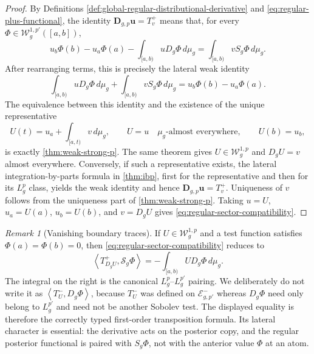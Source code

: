 \documentclass[preprint,12pt]{elsarticle}
\theoremstyle{definition}
\theoremstyle{remark}
\newtheorem{remark}[theorem]{Remark}
\newcommand{\ip}[2]{\left\langle#1,#2\right\rangle}
\begin{document}
\begin{proof}
By Definitions \ref{def:global-regular-distributional-derivative} and \eqref{eq:regular-plus-functional}, the identity $\mathbf D_{g,p}\mathbf u=T_v^+$ means that, for every $\Phi\in\mathcal W_g^{1,p'}([a,b])$,
\[
 u_b\Phi(b)-u_a\Phi(a)
 -\int_{[a,b)}uD_g\Phi\,d\mu_g
 =\int_{[a,b)}vS_g\Phi\,d\mu_g.
\]
After rearranging terms, this is precisely the lateral weak identity
\[
 \int_{[a,b)}uD_g\Phi\,d\mu_g
 +\int_{[a,b)}vS_g\Phi\,d\mu_g
 =u_b\Phi(b)-u_a\Phi(a).
\]
The equivalence between this identity and the existence of the unique representative
\[
 U(t)=u_a+\int_{[a,t)}v\,d\mu_g,
 \qquad U=u\quad\mu_g\text{-almost everywhere},
 \qquad U(b)=u_b,
\]
is exactly \cref{thm:weak-strong-p}. The same theorem gives $U\in\mathcal W_g^{1,p}$ and $D_gU=v$ almost everywhere. Conversely, if such a representative exists, the lateral integration-by-parts formula in \cref{thm:ibp}, first for the representative and then for its $L_g^p$ class, yields the weak identity and hence $\mathbf D_{g,p}\mathbf u=T_v^+$. Uniqueness of $v$ follows from the uniqueness part of \cref{thm:weak-strong-p}. Taking $u=U$, $u_a=U(a)$, $u_b=U(b)$, and $v=D_gU$ gives \eqref{eq:regular-sector-compatibility}.
\end{proof}

\begin{remark}[Vanishing boundary traces]\label{rem:zero-boundary-transposition}
If $U\in\mathcal W_g^{1,p}$ and a test function satisfies $\Phi(a)=\Phi(b)=0$, then \eqref{eq:regular-sector-compatibility} reduces to
\[
 \ip{T_{D_gU}^+}{\mathcal S_g\Phi}
 =-\int_{[a,b)}U D_g\Phi\,d\mu_g.
\]
The integral on the right is the canonical $L_g^p$--$L_g^{p'}$ pairing. We deliberately do not write it as $\ip{T_U^-}{D_g\Phi}$, because $T_U^-$ was defined on $\mathcal E_{g,p'}^-$ whereas $D_g\Phi$ need only belong to $L_g^{p'}$ and need not be another Sobolev test. The displayed equality is therefore the correctly typed first-order transposition formula. Its lateral character is essential: the derivative acts on the posterior copy, and the regular posterior functional is paired with $S_g\Phi$, not with the anterior value $\Phi$ at an atom.
\end{remark}
\end{document}
